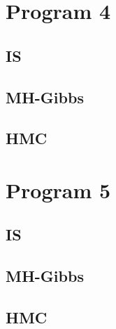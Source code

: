 \documentclass[10pt]{homeworg}
\begin{document}
\section{Program 4}
\subsection{IS}
\subsection{MH-Gibbs}
\subsection{HMC}

\section{Program 5}
\subsection{IS}
\subsection{MH-Gibbs}
\subsection{HMC}
\end{document}
